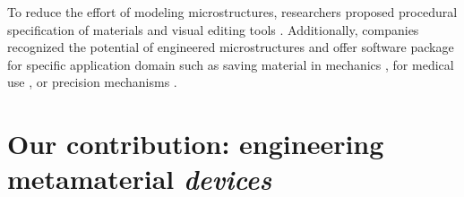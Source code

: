 {To reduce the effort of modeling microstructures, researchers proposed procedural specification of materials \cite{Vidimce2013, Chen2013, Vidimce2016} and visual editing tools \cite{Monolith2018, VoxCAD2018}. Additionally, companies recognized the potential of engineered microstructures and offer software package for specific application domain such as saving material in mechanics \cite{AutodeskNetfabb2018}, for medical use \cite{AutodeskWithin2018}, or precision mechanisms \cite{SPACAR2018}.












\section{Our contribution: engineering metamaterial \textit{devices}}

}
